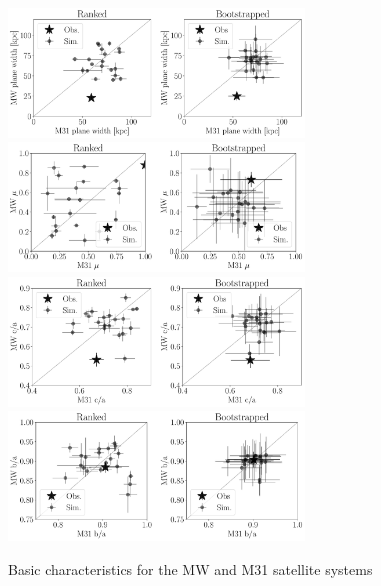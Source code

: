 \documentclass[a4paper,fleqn,usenatbib]{mnras}
\begin{document}
\begin{figure}
\centering
\includegraphics[width=0.7\textwidth]{scatter_width.pdf}
\includegraphics[width=0.7\textwidth]{scatter_mu.pdf}
\includegraphics[width=0.7\textwidth]{scatter_ca_ratio.pdf}
\includegraphics[width=0.7\textwidth]{scatter_ba_ratio.pdf}
\caption{Basic characteristics for the MW and M31 satellite systems
\label{fig:general}}
\end{figure}
\end{document}
